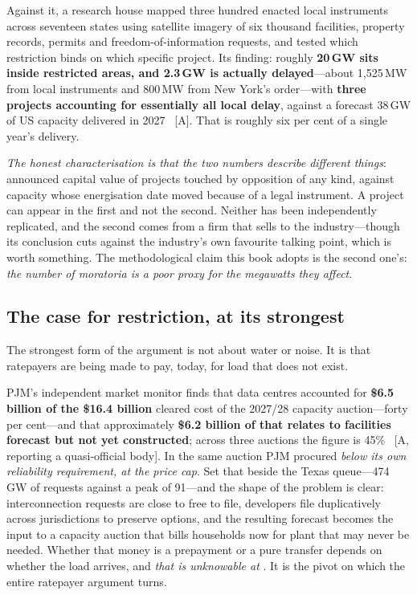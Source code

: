 Against it, a research house mapped three hundred enacted local instruments across seventeen states using satellite imagery of six thousand facilities, property records, permits and freedom-of-information requests, and tested which restriction binds on which specific project. Its finding: roughly \textbf{20\,GW sits inside restricted areas, and 2.3\,GW is actually delayed}---about 1,525\,MW from local instruments and 800\,MW from New York's order---with \textbf{three projects accounting for essentially all local delay}, against a forecast 38\,GW of US capacity delivered in 2027~\cite{moratorium-scale} [A]. That is roughly six per cent of a single year's delivery.

\emph{The honest characterisation is that the two numbers describe different things}: announced capital value of projects touched by opposition of any kind, against capacity whose energisation date moved because of a legal instrument. A project can appear in the first and not the second. Neither has been independently replicated, and the second comes from a firm that sells to the industry---though its conclusion cuts against the industry's own favourite talking point, which is worth something. The methodological claim this book adopts is the second one's: \emph{the number of moratoria is a poor proxy for the megawatts they affect}.

\subsection{The case for restriction, at its strongest}
\label{sec:phantom-load}

The strongest form of the argument is not about water or noise. It is that ratepayers are being made to pay, today, for load that does not exist.

PJM's independent market monitor finds that data centres accounted for \textbf{\$6.5 billion of the \$16.4 billion} cleared cost of the 2027/28 capacity auction---forty per cent---and that approximately \textbf{\$6.2 billion of that relates to facilities forecast but not yet constructed}; across three auctions the figure is 45\%~\cite{moratorium-attribution} [A, reporting a quasi-official body]. In the same auction PJM procured \emph{below its own reliability requirement, at the price cap}. Set that beside the Texas queue---474\,GW of requests against a peak of 91---and the shape of the problem is clear: interconnection requests are close to free to file, developers file duplicatively across jurisdictions to preserve options, and the resulting forecast becomes the input to a capacity auction that bills households now for plant that may never be needed. Whether that money is a prepayment or a pure transfer depends on whether the load arrives, and \emph{that is unknowable at \datafreeze}. It is the pivot on which the entire ratepayer argument turns.


